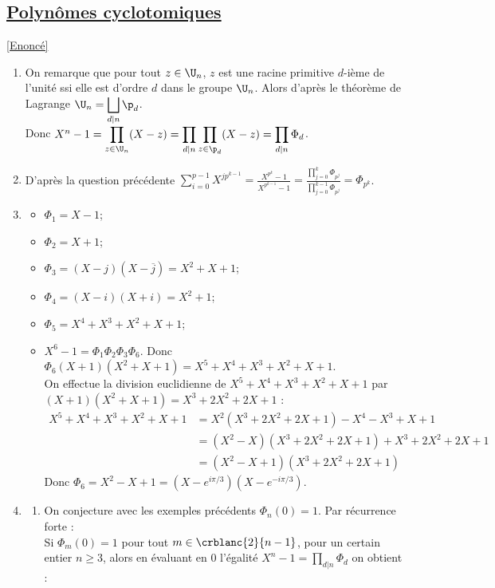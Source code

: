\documentclass{book}
\begin{document}
	\subsection{\underline{Polynômes cyclotomiques} }
	\label{sec:polynomes-cyclotomiques}
	\textcolor{blue}{\hyperref[Polynômes cyclotomiques]{[Enoncé]}}\\
	\begin{enumerate}[leftmargin=*]
		\item On remarque que pour tout $z\in \U_n$, $z$ est une racine primitive $d$-ième de l'unité ssi elle est d'ordre $d$ dans le groupe $\U_n$. Alors d'après le théorème de Lagrange $\U_n=\displaystyle\bigsqcup_{d|n}\p_d$.\\
		Donc $X^n-1=\displaystyle\prod_{z\in \U_n}(X-z)=\prod_{d|n}\prod_{z\in \p_d}(X-z)=\prod_{d|n}\Phi_d$.
		\item D'après la question précédente $\displaystyle\sum_{i=0}^{p-1}X^{jp^{k-1}}=\frac{X^{p^k}-1}{X^{p^{k-1}}-1}=\frac{\prod\limits_{j=0}^k\Phi_{p^j}}{\prod\limits_{j=0}^{k-1}\Phi_{p^j}}=\Phi_{p^k}$.
		\item \begin{itemize}
			\item $\Phi_1=X-1$;
			\item $\Phi_2=X+1$;
			\item $\Phi_3=(X-j)(X-\overline j)=X^2+X+1$;
			\item $\Phi_4=(X-i)(X+i)=X^2+1$;
			\item $\Phi_5=X^4+X^3+X^2+X+1$;
			\item $X^6-1=\Phi_1\Phi_2\Phi_3\Phi_6$. Donc $\Phi_6(X+1)(X^2+X+1)=X^5+X^4+X^3+X^2+X+1$.\\
			On effectue la division euclidienne de $X^5+X^4+X^3+X^2+X+1$ par $(X+1)(X^2+X+1)=X^3+2X^2+2X+1$ :
			\begin{align*}
				X^5+X^4+X^3+X^2+X+1&=X^2(X^3+2X^2+2X+1)-X^4-X^3+X+1\\
				&=(X^2-X)(X^3+2X^2+2X+1)+X^3+2X^2+2X+1\\
				&=(X^2-X+1)(X^3+2X^2+2X+1)
			\end{align*}
			Donc $\Phi_6=X^2-X+1=(X-e^{i\pi/3})(X-e^{-i\pi/3})$.
		\end{itemize}
		\item \begin{enumerate}[label=\alph*.]
			\item On conjecture avec les exemples précédents $\Phi_n(0)=1$. Par récurrence forte :\\
			Si $\Phi_m(0)=1$ pour tout $m\in \crblanc{2}{n-1}$, pour un certain entier $n\geq 3$, alors en évaluant en $0$ l'égalité $X^n-1=\displaystyle\prod_{d|n}\Phi_d$ on obtient :\\

\end{enumerate}
\end{enumerate}
\end{document}
